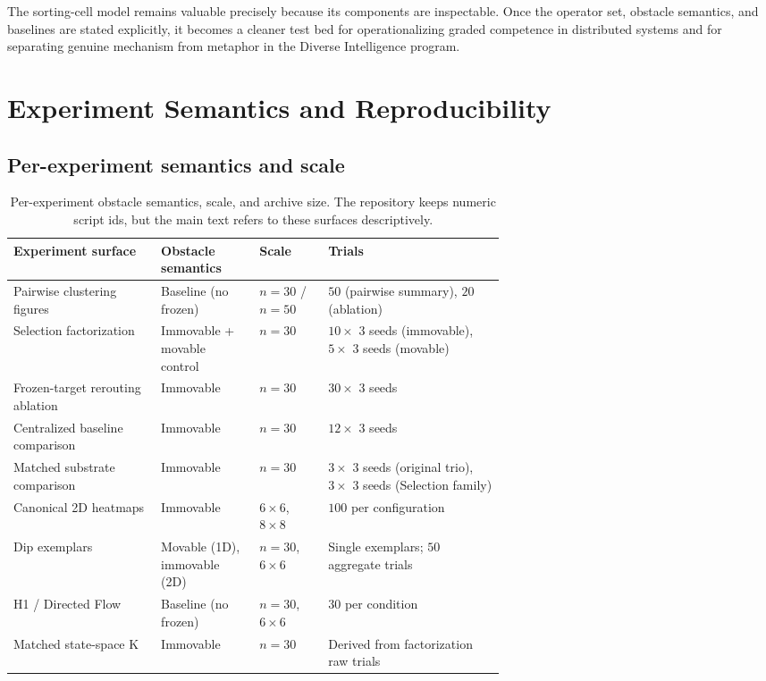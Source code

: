 \documentclass[11pt]{article}
\begin{document}
The sorting-cell model remains valuable precisely because its components are inspectable. Once the
operator set, obstacle semantics, and baselines are stated explicitly, it becomes a cleaner test bed
for operationalizing graded competence in distributed systems and for separating genuine mechanism
from metaphor in the Diverse Intelligence program.

\appendix

\section{Experiment Semantics and Reproducibility}
\label{sec:appendix-repro}

\subsection{Per-experiment semantics and scale}
\begin{table}[h]
  \centering
  \footnotesize
  \setlength{\tabcolsep}{5pt}
  \renewcommand{\arraystretch}{1.08}
  \begin{tabularx}{\linewidth}{@{}p{0.30\linewidth} p{0.20\linewidth} p{0.14\linewidth} X@{}}
    \toprule
    Experiment surface & Obstacle semantics & Scale & Trials \\
    \midrule
    Pairwise clustering figures & Baseline (no frozen) & $n=30$ / $n=50$ & $50$ (pairwise summary), $20$ (ablation) \\
    Selection factorization & Immovable + movable control & $n=30$ & $10 \times$ 3 seeds (immovable), $5 \times$ 3 seeds (movable) \\
    Frozen-target rerouting ablation & Immovable & $n=30$ & $30 \times$ 3 seeds \\
    Centralized baseline comparison & Immovable & $n=30$ & $12 \times$ 3 seeds \\
    Matched substrate comparison & Immovable & $n=30$ & $3 \times$ 3 seeds (original trio), $3 \times$ 3 seeds (Selection family) \\
    Canonical 2D heatmaps & Immovable & $6{\times}6$, $8{\times}8$ & $100$ per configuration \\
    Dip exemplars & Movable (1D), immovable (2D) & $n=30$, $6{\times}6$ & Single exemplars; $50$ aggregate trials \\
    H1 / Directed Flow & Baseline (no frozen) & $n=30$, $6{\times}6$ & $30$ per condition \\
    Matched state-space K & Immovable & $n=30$ & Derived from factorization raw trials \\
    \bottomrule
  \end{tabularx}
  \caption{Per-experiment obstacle semantics, scale, and archive size. The repository keeps numeric script ids, but the main text refers to these surfaces descriptively.}
  \label{tab:semantics}
\end{table}
\end{document}
